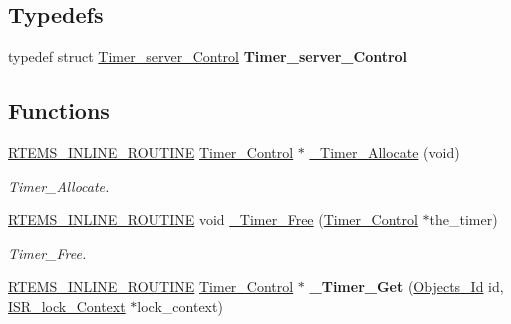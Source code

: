 \subsection*{Typedefs}
\begin{DoxyCompactItemize}
\item 
\mbox{\label{group__ClassicTimerImpl_ga9f1970ae93e4ac67513076a237204d5d}} 
typedef struct \mbox{\hyperlink{structTimer__server__Control}{Timer\+\_\+server\+\_\+\+Control}} {\bfseries Timer\+\_\+server\+\_\+\+Control}
\end{DoxyCompactItemize}
\subsection*{Functions}
\begin{DoxyCompactItemize}
\item 
\mbox{\hyperlink{group__RTEMSScoreBaseDefs_gac216239df231d5dbd15e3520b0b9313f}{R\+T\+E\+M\+S\+\_\+\+I\+N\+L\+I\+N\+E\+\_\+\+R\+O\+U\+T\+I\+NE}} \mbox{\hyperlink{structTimer__Control}{Timer\+\_\+\+Control}} $\ast$ \mbox{\hyperlink{group__ClassicTimerImpl_ga77ef33047cce91fa663a936bafee7eac}{\+\_\+\+Timer\+\_\+\+Allocate}} (void)
\begin{DoxyCompactList}\small\item\em Timer\+\_\+\+Allocate. \end{DoxyCompactList}\item 
\mbox{\hyperlink{group__RTEMSScoreBaseDefs_gac216239df231d5dbd15e3520b0b9313f}{R\+T\+E\+M\+S\+\_\+\+I\+N\+L\+I\+N\+E\+\_\+\+R\+O\+U\+T\+I\+NE}} void \mbox{\hyperlink{group__ClassicTimerImpl_gac8b9418437bbd28ed3d1c81093cb9ec8}{\+\_\+\+Timer\+\_\+\+Free}} (\mbox{\hyperlink{structTimer__Control}{Timer\+\_\+\+Control}} $\ast$the\+\_\+timer)
\begin{DoxyCompactList}\small\item\em Timer\+\_\+\+Free. \end{DoxyCompactList}\item 
\mbox{\label{group__ClassicTimerImpl_ga40195e79d37f84fa3d6b9ba166f6d384}} 
\mbox{\hyperlink{group__RTEMSScoreBaseDefs_gac216239df231d5dbd15e3520b0b9313f}{R\+T\+E\+M\+S\+\_\+\+I\+N\+L\+I\+N\+E\+\_\+\+R\+O\+U\+T\+I\+NE}} \mbox{\hyperlink{structTimer__Control}{Timer\+\_\+\+Control}} $\ast$ {\bfseries \+\_\+\+Timer\+\_\+\+Get} (\mbox{\hyperlink{group__RTEMSScoreObject_ga5821f52a51072941bdd603e542d0863e}{Objects\+\_\+\+Id}} id, \mbox{\hyperlink{structISR__lock__Context}{I\+S\+R\+\_\+lock\+\_\+\+Context}} $\ast$lock\+\_\+context)

\end{DoxyCompactItemize}
